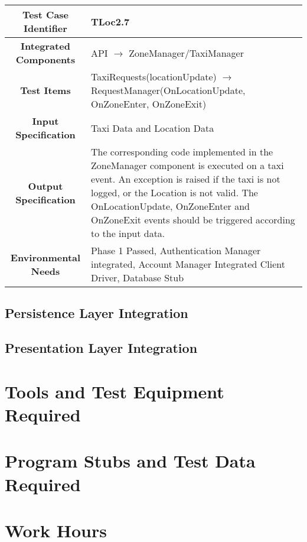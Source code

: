 \documentclass[11pt, a4paper,titlepage]{article}
\begin{document}
	 \begin{tabularx}{\textwidth}{| c|X|}
	 	\hline \textbf{Test Case Identifier} & TLoc2.7\\
	 	\hline \textbf{Integrated Components} & API  $\rightarrow $  ZoneManager/TaxiManager \\
	 	\hline \textbf{Test Items} & TaxiRequests(locationUpdate) $\rightarrow $ RequestManager(OnLocationUpdate, OnZoneEnter, OnZoneExit) \\
	 	\hline \textbf{Input Specification} & Taxi Data and Location Data \\
	 	\hline \textbf{Output Specification} & The corresponding code implemented in the ZoneManager component is executed on a taxi event. 
	 	\newline An exception is raised if the taxi is not logged, or the Location is not valid. \newline
	 	The OnLocationUpdate, OnZoneEnter and OnZoneExit events should be triggered according to the input data. \\
	 	\hline \textbf{Environmental Needs} &  Phase 1 Passed, Authentication Manager integrated, Account Manager Integrated \newline 
	 	Client Driver, Database Stub\\
	 	\hline
	 \end{tabularx}
	 \newline
	 	
	\subsection{Persistence Layer Integration}
	\subsection{Presentation Layer Integration}
	
	\newpage
	\section{Tools and Test Equipment Required}
	\section{Program Stubs and Test Data Required}
	\section{Work Hours}
	
\end{document}

